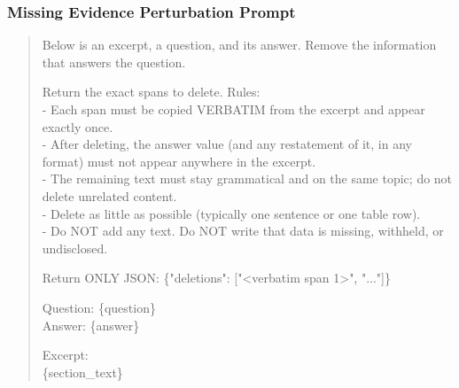 \documentclass[11pt,letterpaper]{article}
\begin{document}
\subsubsection{Missing Evidence Perturbation Prompt}
\begin{quote}\small\ttfamily
Below is an excerpt, a question, and its answer. Remove the information that answers the question.

Return the exact spans to delete. Rules:\\
- Each span must be copied VERBATIM from the excerpt and appear exactly once.\\
- After deleting, the answer value (and any restatement of it, in any format) must not appear anywhere in the excerpt.\\
- The remaining text must stay grammatical and on the same topic; do not delete unrelated content.\\
- Delete as little as possible (typically one sentence or one table row).\\
- Do NOT add any text. Do NOT write that data is missing, withheld, or undisclosed.

Return ONLY JSON: \{"deletions": ["<verbatim span 1>", "..."]\}

Question: \{question\}\\
Answer: \{answer\}

Excerpt:\\
\{section\_text\}
\end{quote}
\end{document}
